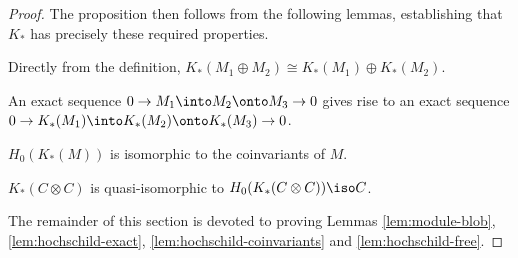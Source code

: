 \begin{proof}
%

The proposition then follows from the following lemmas, establishing that $K_*$ has precisely these required properties.
\begin{lem}
\label{lem:hochschild-additive}%
Directly from the definition, $K_*(M_1 \oplus M_2) \cong K_*(M_1) \oplus K_*(M_2)$.
\end{lem}
\begin{lem}
\label{lem:hochschild-exact}%
An exact sequence $0 \to M_1 \into M_2 \onto M_3 \to 0$ gives rise to an
exact sequence $0 \to K_*(M_1) \into K_*(M_2) \onto K_*(M_3) \to 0$.
\end{lem}
\begin{lem}
\label{lem:hochschild-coinvariants}%
$H_0(K_*(M))$ is isomorphic to the coinvariants of $M$.
\end{lem}
\begin{lem}
\label{lem:hochschild-free}%
$K_*(C\otimes C)$ is quasi-isomorphic to $H_0(K_*(C \otimes C)) \iso C$.
\end{lem}

The remainder of this section is devoted to proving Lemmas
\ref{lem:module-blob},
\ref{lem:hochschild-exact}, \ref{lem:hochschild-coinvariants} and
\ref{lem:hochschild-free}.
\end{proof}

